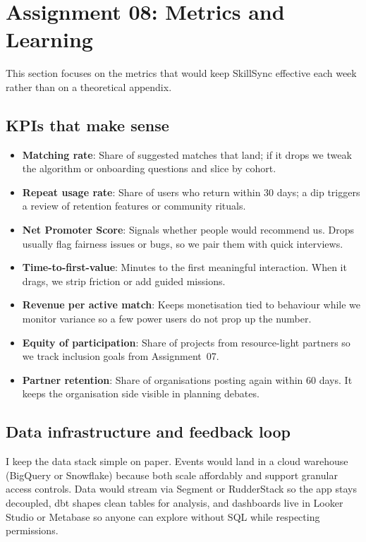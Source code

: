 \section*{Assignment 08: Metrics and Learning}

This section focuses on the metrics that would keep SkillSync effective each week rather than on a theoretical appendix.

\subsection*{KPIs that make sense}
\begin{itemize}
    \item \textbf{Matching rate}: Share of suggested matches that land; if it drops we tweak the algorithm or onboarding questions and slice by cohort.
    \item \textbf{Repeat usage rate}: Share of users who return within 30 days; a dip triggers a review of retention features or community rituals.
    \item \textbf{Net Promoter Score}: Signals whether people would recommend us. Drops usually flag fairness issues or bugs, so we pair them with quick interviews.
    \item \textbf{Time-to-first-value}: Minutes to the first meaningful interaction. When it drags, we strip friction or add guided missions.
    \item \textbf{Revenue per active match}: Keeps monetisation tied to behaviour while we monitor variance so a few power users do not prop up the number.
    \item \textbf{Equity of participation}: Share of projects from resource-light partners so we track inclusion goals from Assignment~07.
    \item \textbf{Partner retention}: Share of organisations posting again within 60 days. It keeps the organisation side visible in planning debates.
\end{itemize}

\subsection*{Data infrastructure and feedback loop}
I keep the data stack simple on paper. Events would land in a cloud warehouse (BigQuery or Snowflake) because both scale affordably and support granular access controls. Data would stream via Segment or RudderStack so the app stays decoupled, dbt shapes clean tables for analysis, and dashboards live in Looker Studio or Metabase so anyone can explore without SQL while respecting permissions.

